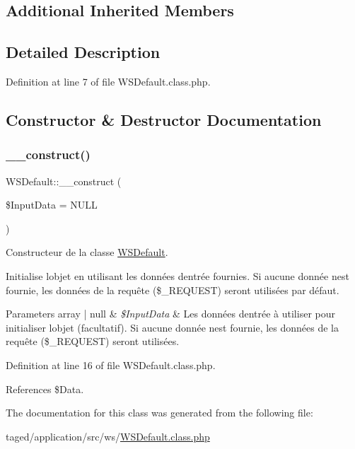 \subsection*{Additional Inherited Members}


\subsection{Detailed Description}


Definition at line 7 of file W\+S\+Default.\+class.\+php.



\subsection{Constructor \& Destructor Documentation}
\mbox{\label{class_w_s_default_aab0e0032ba89c701b9625c472ed86062}} 
\subsubsection{\texorpdfstring{\+\_\+\+\_\+construct()}{\_\_construct()}}
{\footnotesize\ttfamily W\+S\+Default\+::\+\_\+\+\_\+construct (\begin{DoxyParamCaption}\item[{}]{\$\+Input\+Data = {\ttfamily NULL} }\end{DoxyParamCaption})}

Constructeur de la classe \hyperlink{class_w_s_default}{W\+S\+Default}.

Initialise l\textquotesingle{}objet en utilisant les données d\textquotesingle{}entrée fournies. Si aucune donnée n\textquotesingle{}est fournie, les données de la requête (\$\+\_\+\+R\+E\+Q\+U\+E\+ST) seront utilisées par défaut.


\begin{DoxyParams}[1]{Parameters}
array | null & {\em \$\+Input\+Data} & Les données d\textquotesingle{}entrée à utiliser pour initialiser l\textquotesingle{}objet (facultatif). Si aucune donnée n\textquotesingle{}est fournie, les données de la requête (\$\+\_\+\+R\+E\+Q\+U\+E\+ST) seront utilisées. \\
\hline
\end{DoxyParams}


Definition at line 16 of file W\+S\+Default.\+class.\+php.



References \$\+Data.



The documentation for this class was generated from the following file\+:\begin{DoxyCompactItemize}
\item 
taged/application/src/ws/\hyperlink{_w_s_default_8class_8php}{W\+S\+Default.\+class.\+php}\end{DoxyCompactItemize}
